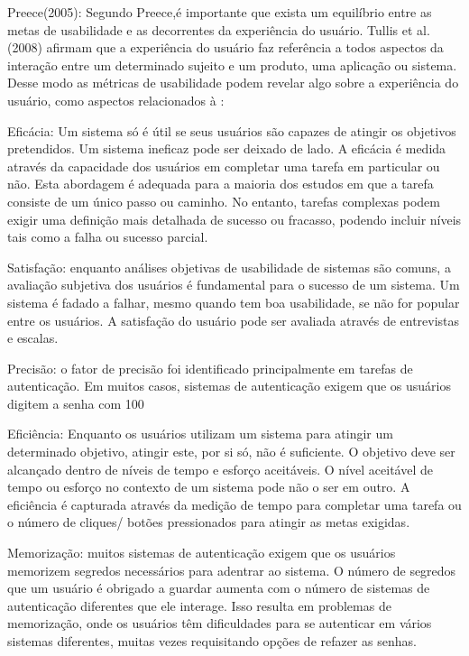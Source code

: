 \documentclass[12pt]{article}
\begin{document}
		Preece(2005): Segundo Preece,é importante que exista um equilíbrio entre as metas de usabilidade e as decorrentes da
	experiência do usuário. Tullis et al. (2008) afirmam que a experiência do usuário faz referência a todos aspectos da interação entre um determinado sujeito e um produto, uma aplicação ou sistema. Desse modo as métricas de usabilidade podem revelar 			algo sobre a experiência do usuário, como aspectos relacionados à :

		Eficácia: Um sistema só é útil se seus usuários são capazes de atingir os objetivos pretendidos. Um sistema ineficaz pode ser deixado de lado. A eficácia é medida através da capacidade dos usuários em completar uma tarefa em particular ou não. 			Esta abordagem é adequada para a maioria dos estudos em que a tarefa consiste de um único passo ou caminho. No entanto, tarefas complexas podem exigir uma definição mais detalhada de sucesso ou fracasso, podendo incluir níveis tais como a falha 			ou sucesso parcial.
		
		Satisfação: enquanto análises objetivas de usabilidade de sistemas são comuns, a avaliação subjetiva dos usuários é fundamental para o sucesso de um sistema. Um sistema é fadado a falhar, mesmo quando tem boa usabilidade, 
	se não for popular entre os usuários. A satisfação do usuário pode ser avaliada através de entrevistas e escalas.

		Precisão: o fator de precisão foi identificado principalmente em tarefas de autenticação. Em muitos casos, sistemas de autenticação exigem que os usuários digitem a senha com 100%

		Eficiência: Enquanto os usuários utilizam um sistema para atingir um determinado objetivo, atingir este, por si só, não é suficiente. O objetivo deve ser alcançado dentro de níveis de tempo e esforço aceitáveis. O nível aceitável de tempo ou esforço 		no contexto de um sistema pode não o ser em outro. A eficiência é capturada através 	da medição de tempo para completar uma tarefa ou o número de cliques/ botões pressionados para atingir as metas exigidas.

		Memorização: muitos sistemas de autenticação exigem que os usuários memorizem segredos necessários para adentrar ao sistema. O número de segredos que um usuário é obrigado a guardar aumenta com o número de sistemas de autenticação 				diferentes que ele interage. Isso resulta em problemas de memorização, onde os usuários têm dificuldades para se autenticar em vários sistemas diferentes, muitas vezes requisitando opções de refazer as senhas.
\end{document}
